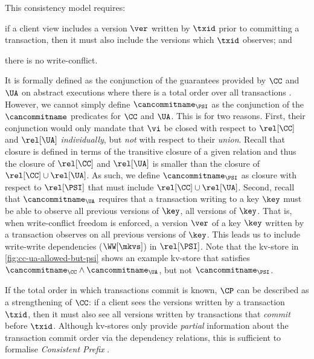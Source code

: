 This consistency model requires: \begin{enumerate*}
\item 
if a client view includes 
a version \(\ver\) written by \( \txid \) prior to committing a transaction, 
then it must also include the versions which \(\txid\) observes; and
\item there is no write-conflict.
\end{enumerate*}
It is formally defined as the conjunction of the guarantees provided by \(\CC\) and \(\UA\) on 
abstract executions where there is a total order over all transactions \cite{framework-concur}. 
However, we cannot simply define \(\cancommitname_{\PSI}\) as the conjunction of the \(\cancommitname\) predicates for \(\CC\) and \(\UA\). 
This is for two reasons. 
First, their conjunction would only mandate that \(\vi\) be closed with respect to 
\(\rel[\CC]\) and \(\rel[\UA]\) \emph{individually}, but \emph{not} with respect to their \emph{union}.
Recall that closure is defined in terms of the transitive closure of a given relation 
and thus the closure of \(\rel[\CC]\) and \(\rel[\UA]\) is smaller than the closure of \(\rel[\CC] \cup \rel[\UA]\).
As such, we define \(\cancommitname_{\PSI}\) as closure with respect to \(\rel[\PSI] \) that must include \( \rel[\CC] \cup \rel[\UA]\).
Second, recall that \(\cancommitname_{\UA}\) requires that a transaction writing 
to a key \(\key\) must be able to observe all previous versions of \(\key\), \ie all versions of \(\key\). 
That is, when write-conflict freedom is enforced, a version \(\ver\) of a key \( \key \)
written by a transaction observes on all previous versions of \(\key\). 
This leads us to include write-write dependencies (\(\WW[\mkvs]\)) in \(\rel[\PSI]\). 
Note that the kv-store in \cref{fig:cc-ua-allowed-but-psi} shows an example kv-store that satisfies \(\cancommitname_{\CC} \land \cancommitname_{\UA}\), 
but not \(\cancommitname_{\PSI}\).

\label{para:cp}
If the total order in which transactions commit is known, \(\CP\)
can be described as a strengthening of \(\CC\): 
if a client sees the versions written by a transaction \(\txid\),
then it must also see all versions written by transactions that \emph{commit} before \(\txid\). 
Although kv-stores only provide \emph{partial} information about the transaction commit order via the dependency relations,
this is sufficient to formalise \emph{Consistent Prefix} \cite{laws}.


